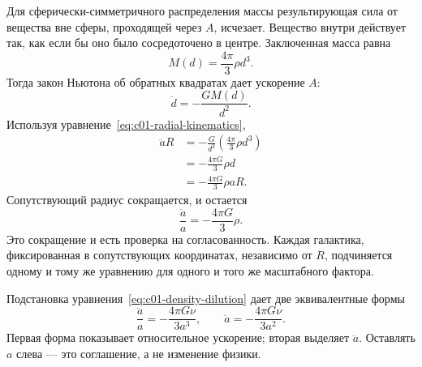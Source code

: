 Для сферически-симметричного распределения массы результирующая сила от вещества вне сферы, проходящей через \(A\), исчезает. Вещество внутри действует так, как если бы оно было сосредоточено в центре. Заключенная масса равна
\begin{equation}
M(d)=\frac{4\pi}{3}\rho d^3.
\label{eq:c01-enclosed-mass}
\end{equation}
Тогда закон Ньютона об обратных квадратах дает ускорение \(A\):
\begin{equation}
\ddot d=-\frac{GM(d)}{d^2}.
\end{equation}
Используя уравнение~\eqref{eq:c01-radial-kinematics},
\begin{align}
\ddot a R
&=-\frac{G}{d^2}\left(\frac{4\pi}{3}\rho d^3\right) \\
&=-\frac{4\pi G}{3}\rho d \\
&=-\frac{4\pi G}{3}\rho aR.
\end{align}
Сопутствующий радиус сокращается, и остается
\begin{equation}
\boxed{\frac{\ddot a}{a}=-\frac{4\pi G}{3}\rho.}
\label{eq:c01-acceleration}
\end{equation}
Это сокращение и есть проверка на согласованность. Каждая галактика, фиксированная в сопутствующих координатах, независимо от \(R\), подчиняется одному и тому же уравнению для одного и того же масштабного фактора.

Подстановка уравнения~\eqref{eq:c01-density-dilution} дает две эквивалентные формы
\begin{equation}
\frac{\ddot a}{a}=-\frac{4\pi G\nu}{3a^3},
\qquad
\ddot a=-\frac{4\pi G\nu}{3a^2}.
\label{eq:c01-acceleration-nu}
\end{equation}
Первая форма показывает относительное ускорение; вторая выделяет \(\ddot a\). Оставлять \(a\) слева — это соглашение, а не изменение физики.

\begin{classroomqa}
\end{classroomqa}

